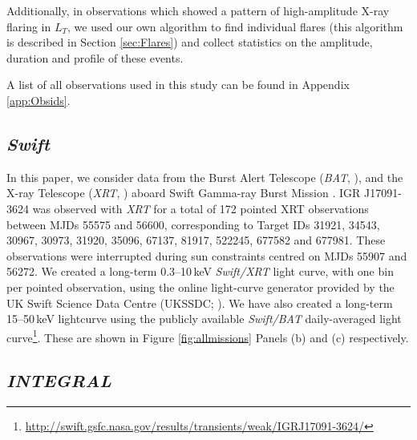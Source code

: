 \par Additionally, in observations which showed a pattern of high-amplitude X-ray flaring in $L_T$, we used our own algorithm to find individual flares (this algorithm is described in Section \ref{sec:Flares}) and collect statistics on the amplitude, duration and profile of these events.
\par A list of all observations used in this study can be found in Appendix \ref{app:Obsids}.

\subsection{\textit{Swift}}

\par In this paper, we consider data from the Burst Alert Telescope (\textit{BAT}, \citealt{Barthelmy_BAT}), and the X-ray Telescope (\textit{XRT}, \citealt{Burrows_XRT}) aboard Swift Gamma-ray Burst Mission \citep{Gehrels_Swift}.  IGR J17091-3624 was observed with \textit{XRT} for a total of 172 pointed XRT observations between MJDs 55575 and 56600, corresponding to Target IDs 31921, 34543, 30967, 30973, 31920, 35096, 67137, 81917, 522245, 677582 and 677981.  These observations were interrupted during sun constraints centred on MJDs 55907 and 56272.  We created a long-term 0.3--10\,keV \textit{Swift/XRT} light curve, with one bin per pointed observation, using the online light-curve generator provided by the UK Swift Science Data Centre (UKSSDC; \citealp{Evans_Swift1}).  We have also created a long-term 15--50\,keV lightcurve using the publicly available \textit{Swift/BAT} daily-averaged light curve\footnote{\url{http://swift.gsfc.nasa.gov/results/transients/weak/IGRJ17091-3624/}}.  These are shown in Figure \ref{fig:allmissions} Panels (b) and (c) respectively.

\subsection{\textit{INTEGRAL}}

